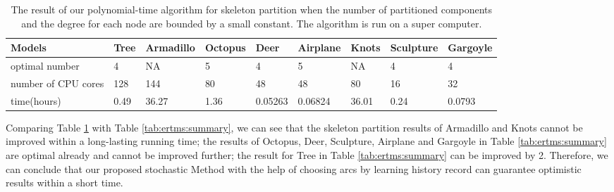 \begin{table}[htb]

\begin{footnotesize}

\begin{center}

    \begin{tabular}{p{3.0cm} p{1.55cm} p{1.3cm} p{1.0cm} p{1.3cm} p{2.25cm} p{1.2cm} p{1.2cm}p{1.4cm}}

    \hline

     Models          & Tree           & Armadillo      & Octopus   & Deer      & Airplane      & Knots    &Sculpture  & Gargoyle\\ \hline
     optimal number   & 4             & NA              & 5         & 4         & 5             & NA      & 4         &4 \\ \hline
     number of CPU cores &128         & 144            & 80        & 48        &48             & 80       &16         &32 \\ \hline
     time(hours)     &0.49            & 36.27          & 1.36      &0.05263   &0.06824        & 36.01    &0.24       &0.0793 \\ \hline

    \end{tabular}

\end{center}

\end{footnotesize}

\caption{The result of our polynomial-time algorithm for skeleton partition when the number of partitioned components and the degree for each node are bounded by a small constant. The algorithm is run on a super computer.}\label{tab:ertms:super}

\end{table}


Comparing Table \ref{tab:ertms:super} with Table \ref{tab:ertms:summary}, we can see that the skeleton partition results of Armadillo and Knots cannot be improved within a long-lasting running time; the results of Octopus, Deer, Sculpture, Airplane and Gargoyle in Table \ref{tab:ertms:summary} are optimal already and cannot be improved further; the result for Tree in Table \ref{tab:ertms:summary} can be improved by 2.
{ Therefore, we can conclude that our proposed stochastic Method with the help of {\color{red}choosing arcs by learning history record} can guarantee optimistic results within a short time.}



